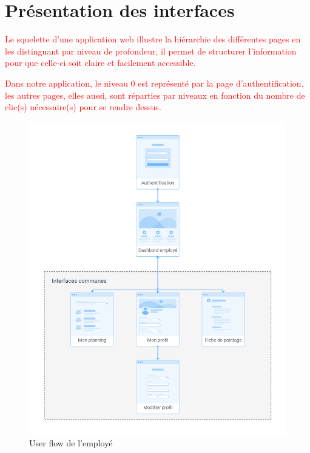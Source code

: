 \section{Présentation des interfaces}
\textcolor{red}{
Le squelette d’une application web illustre la hiérarchie des différentes pages 
en les distinguant par niveau de profondeur, il permet de structurer 
l’information pour que celle-ci soit claire et facilement accessible.

Dans notre application, le niveau 0 est représenté par la page 
d’authentification, les autres pages, elles aussi, sont réparties par niveaux en 
fonction du nombre de clic(s) nécessaire(s) pour se rendre dessus.
}
\begin{figure}[h!]
    \vspace{-30pt}
    \centering
    \includegraphics[scale=0.38 ]{images/interface/Espace employe.png}
    \vspace{-20pt}
    \caption{User flow de l'employé}
    \label{fig91}
\end{figure} 

\clearpage

